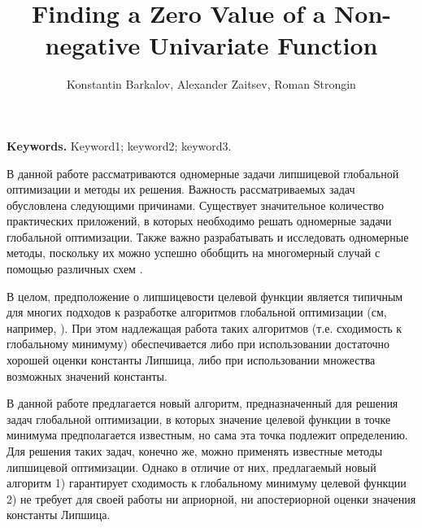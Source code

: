 \documentclass[oribibl]{llncs}
\begin{document}
\cleardoublepage

\title{Finding a Zero Value of a Non-negative Univariate Function}
\author{Konstantin Barkalov, Alexander Zaitsev, Roman Strongin}



\maketitle

\thispagestyle{fancy}

\textbf{Keywords.} Keyword1; keyword2; keyword3.

 \vspace*{0.5cm}


В данной работе рассматриваются одномерные задачи липшицевой глобальной оптимизации и методы их решения. Важность рассматриваемых задач обусловлена следующими причинами.
Существует значительное количество практических приложений, в которых необходимо решать одномерные задачи глобальной оптимизации. Также важно разрабатывать и исследовать одномерные методы, поскольку их можно успешно обобщить на многомерный случай с помощью различных схем \cite{Sergeyev2013,Sergeyev2017}.

В целом, предположение о липшицевости целевой функции является типичным для многих подходов к разработке алгоритмов глобальной оптимизации (см, например, \cite{Evtushenko2013,Jones2021}). При этом надлежащая работа таких алгоритмов (т.е. сходимость к глобальному минимуму) обеспечивается либо при использовании достаточно хорошей оценки константы Липшица, либо при использовании множества возможных значений константы.

В данной работе предлагается новый алгоритм, предназначенный для решения задач глобальной оптимизации, в которых значение целевой функции в точке минимума предполагается известным, но сама эта точка подлежит определению. Для решения таких задач, конечно же, можно применять известные методы липшицевой оптимизации. Однако в отличие от них, предлагаемый новый алгоритм 1) гарантирует сходимость к глобальному минимуму целевой функции 2) не требует для своей работы ни априорной, ни апостериорной оценки значения константы Липшица.
\end{document}
